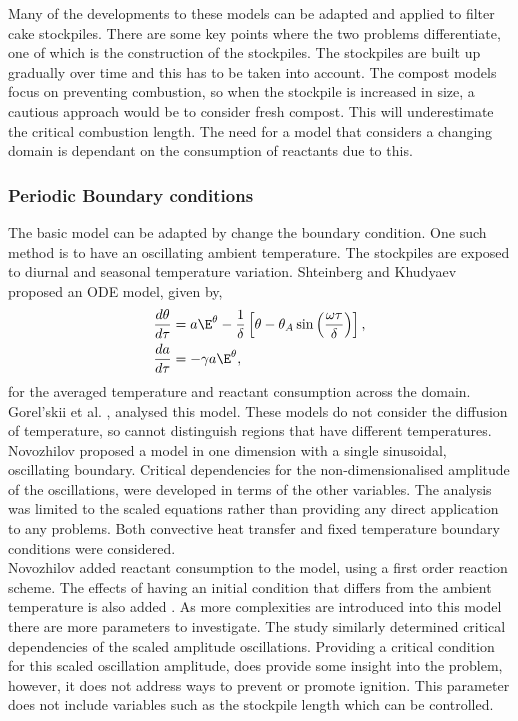 Many of the developments to these models can be adapted and applied to filter cake stockpiles. There are some key points where the two problems differentiate, one of which is the construction of the stockpiles. The stockpiles are built up gradually over time and this has to be taken into account. The compost models focus on preventing combustion, so when the stockpile is increased in size, a cautious approach would be to consider fresh compost. This will underestimate the critical combustion length. The need for a model that considers a changing domain is dependant on the consumption of reactants due to this.
\subsubsection{Periodic Boundary conditions}
The basic model can be adapted by change the boundary condition. One such method is to have an oscillating ambient temperature. The stockpiles are exposed to diurnal and seasonal temperature variation. Shteinberg and Khudyaev \cite{shtein05} proposed an ODE model, given by,
\begin{align}
\frac{d\theta}{d\tau}&=a\E^\theta-\frac{1}{\delta}\left[\theta-\theta_A\sin\left(\frac{\omega\tau}{\delta}\right)\right],\\
\frac{da}{d\tau}&=-\gamma a\E^\theta,
\end{align}
for the averaged temperature and reactant consumption across the domain. Gorel'skii et al. \cite{gorel10}, analysed this model. These models do not consider the diffusion of temperature, so cannot distinguish regions that have different temperatures. \\
Novozhilov \cite{novozhilov16} proposed a model in one dimension with a single sinusoidal, oscillating boundary. Critical dependencies for the non-dimensionalised amplitude of the oscillations, were developed in terms of the other variables. The analysis was limited to the scaled equations rather than providing any direct application to any problems. Both convective heat transfer and fixed temperature boundary conditions were considered.\\
Novozhilov \cite{novozhilov18} added reactant consumption to the model, using a first order reaction scheme. The effects of having an initial condition that differs from the ambient temperature is also added \cite{novozhilov18}. As more complexities are introduced into this model there are more parameters to investigate. The study similarly determined critical dependencies of the scaled amplitude oscillations. Providing a critical condition for this scaled oscillation amplitude, does provide some insight into the problem, however, it does not address ways to prevent or promote ignition. This parameter does not include variables such as the stockpile length which can be controlled.\\ 
